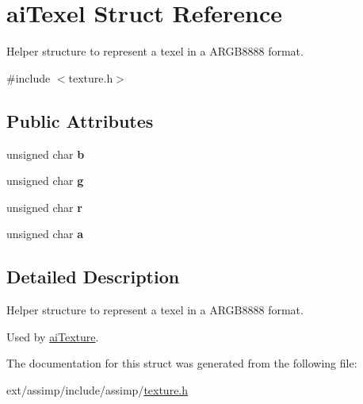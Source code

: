 \hypertarget{structai_texel}{\section{ai\-Texel Struct Reference}
\label{structai_texel}
}


Helper structure to represent a texel in a A\-R\-G\-B8888 format.  




{\ttfamily \#include $<$texture.\-h$>$}

\subsection*{Public Attributes}
\begin{DoxyCompactItemize}
\item 
\hypertarget{structai_texel_a5b4f97f69cf59cb9065af67389599ba6}{unsigned char {\bfseries b}}\label{structai_texel_a5b4f97f69cf59cb9065af67389599ba6}

\item 
\hypertarget{structai_texel_a41da3516b8241165e4ca58ea8ed68fe6}{unsigned char {\bfseries g}}\label{structai_texel_a41da3516b8241165e4ca58ea8ed68fe6}

\item 
\hypertarget{structai_texel_ae9408c0d18f6ff597715cc626398a0ff}{unsigned char {\bfseries r}}\label{structai_texel_ae9408c0d18f6ff597715cc626398a0ff}

\item 
\hypertarget{structai_texel_a6d4450e83b02b29d24f7aab27958034e}{unsigned char {\bfseries a}}\label{structai_texel_a6d4450e83b02b29d24f7aab27958034e}

\end{DoxyCompactItemize}


\subsection{Detailed Description}
Helper structure to represent a texel in a A\-R\-G\-B8888 format. 

Used by \hyperlink{structai_texture}{ai\-Texture}. 

The documentation for this struct was generated from the following file\-:\begin{DoxyCompactItemize}
\item 
ext/assimp/include/assimp/\hyperlink{texture_8h}{texture.\-h}\end{DoxyCompactItemize}
